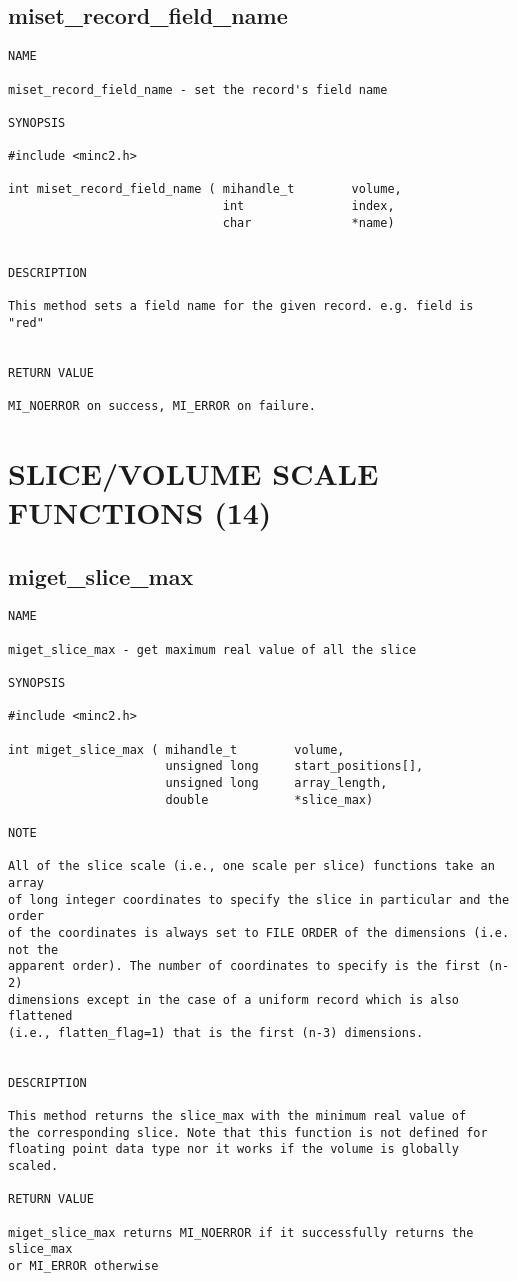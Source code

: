 \documentclass{article}
\begin{document}
\subsection{miset\_record\_field\_name}
\begin{verbatim}
NAME

miset_record_field_name - set the record's field name

SYNOPSIS

#include <minc2.h>

int miset_record_field_name ( mihandle_t        volume,
                              int               index,
                              char              *name)
                                

DESCRIPTION

This method sets a field name for the given record. e.g. field is "red"


RETURN VALUE

MI_NOERROR on success, MI_ERROR on failure.
\end{verbatim}

\section{SLICE/VOLUME SCALE FUNCTIONS (14)}

\subsection{miget\_slice\_max}
\begin{verbatim}
NAME 

miget_slice_max - get maximum real value of all the slice

SYNOPSIS

#include <minc2.h>

int miget_slice_max ( mihandle_t        volume,
                      unsigned long     start_positions[],
                      unsigned long     array_length,
                      double            *slice_max)
                       
NOTE

All of the slice scale (i.e., one scale per slice) functions take an array
of long integer coordinates to specify the slice in particular and the order 
of the coordinates is always set to FILE ORDER of the dimensions (i.e. not the
apparent order). The number of coordinates to specify is the first (n-2) 
dimensions except in the case of a uniform record which is also flattened
(i.e., flatten_flag=1) that is the first (n-3) dimensions.                                


DESCRIPTION

This method returns the slice_max with the minimum real value of
the corresponding slice. Note that this function is not defined for
floating point data type nor it works if the volume is globally scaled.

RETURN VALUE

miget_slice_max returns MI_NOERROR if it successfully returns the slice_max
or MI_ERROR otherwise
\end{verbatim}
\end{document}
